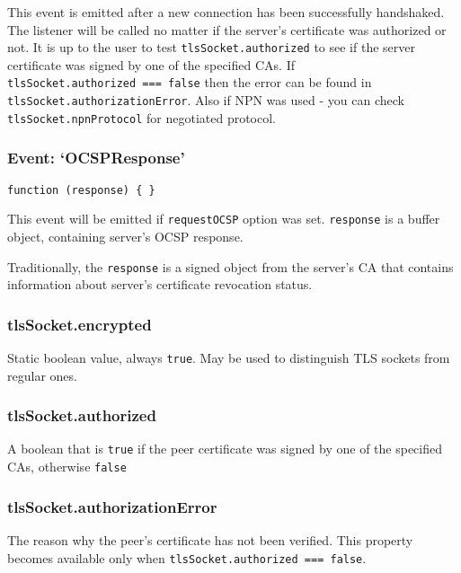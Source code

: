 This event is emitted after a new connection has been successfully
handshaked. The listener will be called no matter if the server's
certificate was authorized or not. It is up to the user to test
\texttt{tlsSocket.authorized} to see if the server certificate was
signed by one of the specified CAs. If
\texttt{tlsSocket.authorized\ ===\ false} then the error can be found in
\texttt{tlsSocket.authorizationError}. Also if NPN was used - you can
check \texttt{tlsSocket.npnProtocol} for negotiated protocol.

\subsubsection{\texorpdfstring{Event:
`OCSPResponse'}{Event: OCSPResponse}}\label{event-ocspresponse}

\texttt{function\ (response)\ \{\ \}}

This event will be emitted if \texttt{requestOCSP} option was set.
\texttt{response} is a buffer object, containing server's OCSP response.

Traditionally, the \texttt{response} is a signed object from the
server's CA that contains information about server's certificate
revocation status.

\subsubsection{tlsSocket.encrypted}\label{tlssocket.encrypted}

Static boolean value, always \texttt{true}. May be used to distinguish
TLS sockets from regular ones.

\subsubsection{tlsSocket.authorized}\label{tlssocket.authorized}

A boolean that is \texttt{true} if the peer certificate was signed by
one of the specified CAs, otherwise \texttt{false}

\subsubsection{tlsSocket.authorizationError}\label{tlssocket.authorizationerror}

The reason why the peer's certificate has not been verified. This
property becomes available only when
\texttt{tlsSocket.authorized\ ===\ false}.

